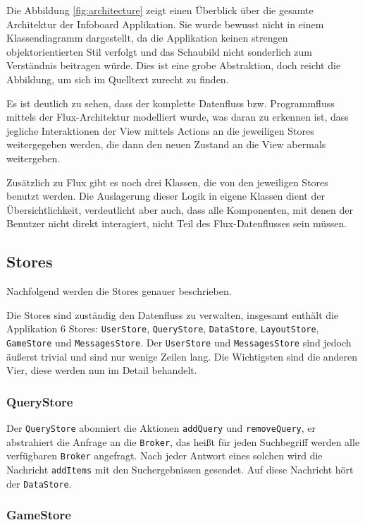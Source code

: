 \documentclass[12pt,twoside]{book}
\begin{document}
Die Abbildung \ref{fig:architecture} zeigt einen Überblick über die gesamte Architektur der Infoboard Applikation. Sie wurde bewusst nicht in einem Klassendiagramm dargestellt, da die Applikation keinen strengen objektorientierten Stil verfolgt und das Schaubild nicht sonderlich zum Verständnis beitragen würde. Dies ist eine grobe Abstraktion, doch reicht die Abbildung, um sich im Quelltext zurecht zu finden.

Es ist deutlich zu sehen, dass der komplette Datenfluss bzw. Programmfluss mittels der Flux-Architektur modelliert wurde, was daran zu erkennen ist, dass jegliche Interaktionen der View mittels Actions an die jeweiligen Stores weitergegeben werden, die dann den neuen Zustand an die View abermals weitergeben.

Zusätzlich zu Flux gibt es noch drei Klassen, die von den jeweiligen Stores benutzt werden. Die Auslagerung dieser Logik in eigene Klassen dient der Übersichtlichkeit, verdeutlicht aber auch, dass alle Komponenten, mit denen der Benutzer nicht direkt interagiert, nicht Teil des Flux-Datenflusses sein müssen.

\subsection{Stores}

Nachfolgend werden die Stores genauer beschrieben.

Die Stores sind zuständig den Datenfluss zu verwalten, insgesamt enthält die Applikation 6 Stores: \texttt{UserStore}, \texttt{QueryStore}, \texttt{DataStore}, \texttt{LayoutStore}, \texttt{GameStore} und \texttt{MessagesStore}.
Der \texttt{UserStore} und \texttt{MessagesStore} sind jedoch äußerst trivial und sind nur wenige Zeilen lang. Die Wichtigsten sind die anderen Vier, diese werden nun im Detail behandelt.

\subsubsection*{QueryStore}

Der \texttt{QueryStore} abonniert die Aktionen \texttt{addQuery} und \texttt{removeQuery}, er abstrahiert die Anfrage an die \texttt{Broker}, das heißt für jeden Suchbegriff werden alle verfügbaren \texttt{Broker} angefragt. Nach jeder Antwort eines solchen wird die Nachricht \texttt{addItems} mit den Suchergebnissen gesendet. Auf diese Nachricht hört der \texttt{DataStore}.

\subsubsection*{GameStore}
\end{document}
